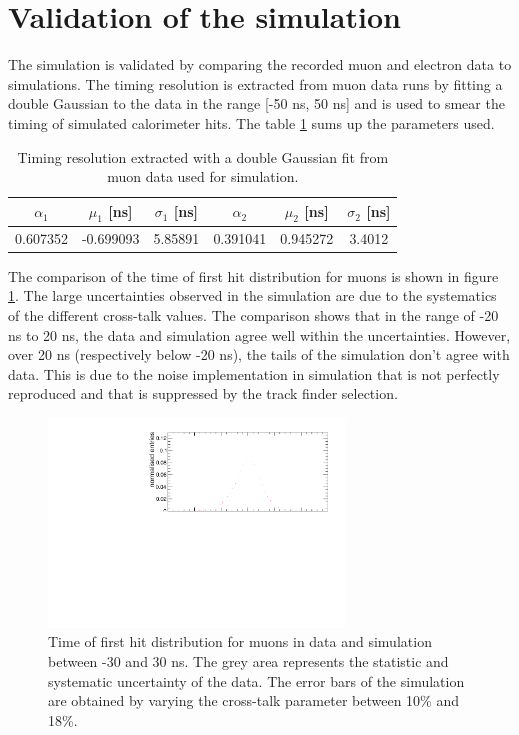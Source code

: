 \section{Validation of the simulation}

The simulation is validated by comparing the recorded muon and electron data to simulations. The timing resolution is extracted from muon data runs by fitting a double Gaussian to the data in the range [-50 ns, 50 ns] and is used to smear the timing of simulated calorimeter hits. The table \ref{table:time_res_sim} sums up the parameters used.

\begin{table}[htb!]
	\centering
	\caption{Timing resolution extracted with a double Gaussian fit from muon data used for simulation.}
	\label{table:time_res_sim}
	\begin{tabular}{@{} cccccc @{}}
		\hline
		$\alpha_{1}$ & $\mu_{1}$ [ns] & $\sigma_{1}$ [ns] & $\alpha_{2}$ & $\mu_{2}$ [ns] & $\sigma_{2}$ [ns] \\
		\hline
		0.607352 & -0.699093 & 5.85891 & 0.391041 & 0.945272 & 3.4012 \\
		\hline
	\end{tabular}
\end{table}

The comparison of the time of first hit distribution for muons is shown in figure \ref{fig:sim_data_muon}. The large uncertainties observed in the simulation are due to the systematics of the different cross-talk values. The comparison shows that in the range of -20 ns to 20 ns, the data and simulation agree well within the uncertainties. However, over 20 ns (respectively below -20 ns), the tails of the simulation don't agree with data. This is due to the noise implementation in simulation that is not perfectly reproduced and that is suppressed by the track finder selection.

\begin{figure}[htbp!]
	\centering
	\includegraphics[width=0.7\textwidth]{../Thesis_Plots/Timing/Muons/Plots/Comparison_MokkaDD4hepData_Muons.pdf}
	\caption{Time of first hit distribution for muons in data and simulation between -30 and 30 ns. The grey area represents the statistic and systematic uncertainty of the data. The error bars of the simulation are obtained by varying the cross-talk parameter between 10\% and 18\%.}
	\label{fig:sim_data_muon}
\end{figure}

